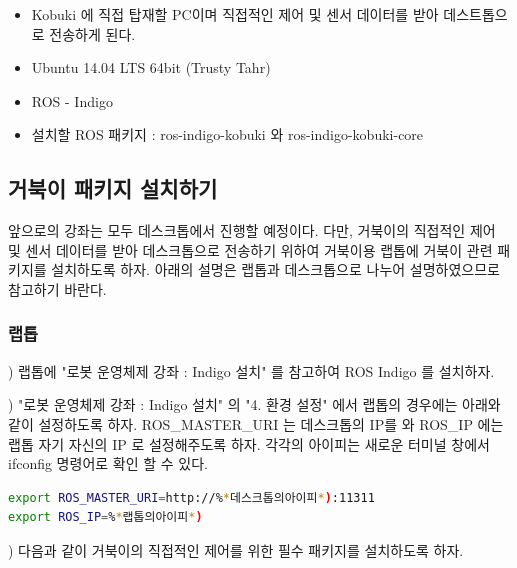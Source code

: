\begin{itemize}[leftmargin=*]
\item Kobuki 에 직접 탑재할 PC이며 직접적인 제어 및 센서 데이터를 받아 데스트톱으로 전송하게 된다.
\item Ubuntu 14.04 LTS 64bit (Trusty Tahr)
\item ROS - Indigo
\item 설치할 ROS 패키지 : ros-indigo-kobuki 와 ros-indigo-kobuki-core
 \end{itemize}

\subsection{거북이 패키지 설치하기}

앞으로의 강좌는 모두 데스크톱에서 진행할 예정이다. 다만, 거북이의 직접적인 제어 및 센서 데이터를 받아 데스크톱으로 전송하기 위하여 거북이용 랩톱에 거북이 관련 패키지를 설치하도록 하자. 아래의 설명은 랩톱과 데스크톱으로 나누어 설명하였으므로 참고하기 바란다.

\subsubsection{랩톱}

\setcounter{num}{0}

\vspace{\baselineskip}
\noindent{}
\thenum) 랩톱에 "로봇 운영체제 강좌 : Indigo 설치" 를 참고하여 ROS Indigo 를 설치하자. 

\vspace{\baselineskip}
\noindent{}
\thenum) "로봇 운영체제 강좌 : Indigo 설치" 의 "4. 환경 설정" 에서 랩톱의 경우에는 아래와 같이 설정하도록 하자. ROS\_MASTER\_URI 는 데스크톱의 IP를 와 ROS\_IP 에는 랩톱 자기 자신의  IP 로 설정해주도록 하자. 각각의 아이피는 새로운 터미널 창에서 ifconfig 명령어로 확인 할 수 있다.

\begin{lstlisting}[language=bash]
export ROS_MASTER_URI=http://%*데스크톱의아이피*):11311
export ROS_IP=%*랩톱의아이피*)
\end{lstlisting}

\vspace{\baselineskip}
\noindent{}
\thenum) 다음과 같이 거북이의 직접적인 제어를 위한 필수 패키지를 설치하도록 하자.

